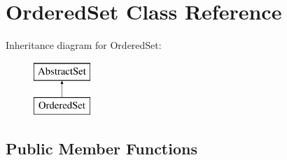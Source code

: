 \hypertarget{classOrderedSet}{\section{Ordered\-Set Class Reference}
\label{classOrderedSet}
}
Inheritance diagram for Ordered\-Set\-:\begin{figure}[H]
\begin{center}
\leavevmode
\includegraphics[height=2.000000cm]{classOrderedSet}
\end{center}
\end{figure}
\subsection*{Public Member Functions}
